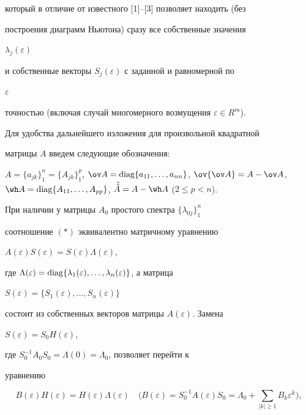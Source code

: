 который в отличие от известного [1]--[3] позволяет находить (без 


построения диаграмм Ньютона) сразу все собственные значения 


$\lambda_j(\varepsilon)$ 


и собственные векторы $S_j(\varepsilon)$ с заданной и равномерной по 


$\varepsilon$ 


точностью (включая случай многомерного возмущения $\varepsilon\in 


R^m$). 


 


Для удобства дальнейшего изложения для произвольной квадратной 


матрицы $A$ введем следующие обозначения:


$A=\{a_{jk}\}^n_1=\{A_{jk}\}^p_1$, $\ov 


A=\diag\{a_{11},\dotsc,a_{nn}\}$, $\ov{\ov A}=A-\ov A$, $\wh 


A=\diag\{A_{11},\dotsc,A_{pp}\}$, $\Hat{\Hat A}=A-\wh A$ ($2\le p<n$). 


При наличии у матрицы $A_0$ простого спектра $\{\lambda_{0j}\}^n_1$ 


соотношение $(*)$ эквивалентно матричному уравнению 


$A(\varepsilon)S(\varepsilon)=S(\varepsilon)\Lambda(\varepsilon)$, 


где $\Lambda(\varepsilon)=\diag\{\lambda_1(\varepsilon),\dotsc, 


\lambda_n(\varepsilon)\}$, а матрица 


$S(\varepsilon)=\{S_1(\varepsilon),\dotsc, S_n(\varepsilon)\}$ 


состоит из собственных векторов матрицы $A(\varepsilon)$. Замена 


$S(\varepsilon)=S_0H(\varepsilon)$, 


где $S^{-1}_0A_0S_0=\Lambda(0)=\Lambda_0$, позволяет перейти к 


уравнению 


\begin{equation} 


B(\varepsilon)H(\varepsilon)=H(\varepsilon)\Lambda 


(\varepsilon)\quad \bigg(B(\varepsilon)=S^{-1}_0A(\varepsilon) 


S_0=\Lambda_0+\sum_{|k|\ge1}B_k\varepsilon^k 


\bigg),\tag{$**$} 


\end{equation}  



